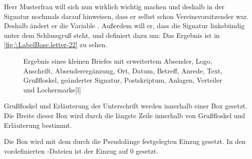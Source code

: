 \begin{Example}
  Herr Musterfrau will sich nun wirklich wichtig machen und deshalb in der
  Signatur nochmals darauf hinweisen, dass er selbst schon Vereinsvorsitzender
  war. Deshalb ändert er die Variable
  . Außerdem will er, dass die Signatur
  linksbündig unter dem Schlussgruß steht, und definiert dazu
   um:%
  {}%
  Das Ergebnis ist in \autoref{fig:\LabelBase.letter-22} zu sehen.%
  \iffalse %
  Dieses Beispiel zeigt die wichtigsten Elemente des Briefbogens und kann so
  als Muster für eigene Briefe dienen.%
  \fi %
  \begin{figure}
    \setcapindent{0pt}%
    \begin{captionbeside}{Ergebnis eines kleinen Briefes mit erweitertem Absender,
        Logo, Anschrift, Absenderergänzung, Ort, Datum, Betreff,
        Anrede, Text, Grußfloskel, geänderter Signatur, Postskriptum, Anlagen,
        Verteiler und Lochermarke}[l]
    \end{captionbeside}
    \label{fig:\LabelBase.letter-22}
  \end{figure}
\end{Example}
\iffalse%
  Das vorausgehende Beispiel zeigt die wichtigsten, aber nicht alle möglichen
  Elemente eines Briefes. Es kann jedoch sehr gut als allgemeines Muster
  dienen.%
\else
  \ExampleEndFix%
\fi
%
\EndIndexGroup


\begin{Declaration}
\end{Declaration}
Grußfloskel und Erläuterung der
Unterschrift werden innerhalb einer Box gesetzt.  Die
Breite dieser Box wird durch die längste Zeile innerhalb von Grußfloskel und
Erläuterung bestimmt.

Die Box wird mit dem durch die Pseudolänge  festgelegten
Einzug gesetzt. In den vordefinierten
-Dateien ist der Einzug auf 0 gesetzt.

